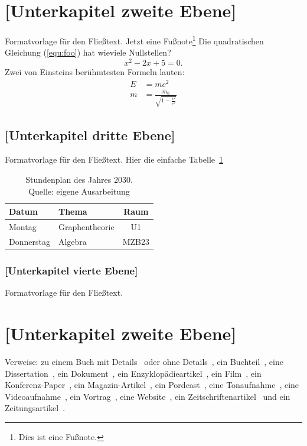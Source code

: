 \section{[Unterkapitel zweite Ebene]}
Formatvorlage für den Fließtext.
Jetzt eine Fußnote\footnote{Dies ist eine Fußnote.}
Die quadratischen Gleichung (\ref{equ:foo}) hat wieviele Nullstellen?
\begin{equation}
 \label{equ:foo}
 x^2-2x+5=0.
\end{equation}
Zwei von Einsteins berühmtesten Formeln lauten:
\begin{eqnarray*}
  E &= mc^2                                  \\
  m &= \frac{m_0}{\sqrt{1-\frac{v^2}{c^2}}}
\end{eqnarray*}


\subsection{[Unterkapitel dritte Ebene]}
Formatvorlage für den Fließtext. Hier die einfache Tabelle~\ref{tab:sp}

\begin{table}[htb]
  \centering
  \begin{tabular}{ | l | l |c|}
    \toprule
    Datum      & Thema           & Raum \\
    \midrule
    Montag     & Graphentheorie  & U1   \\
    \midrule
    Donnerstag & Algebra         & MZB23\\
    \bottomrule
  \end{tabular}
  \caption[Stundenplan]{Stundenplan des Jahres 2030.\\Quelle: eigene Ausarbeitung}\label{tab:sp}
\end{table}

\subsubsection{[Unterkapitel vierte Ebene]}
Formatvorlage für den Fließtext.



\section{[Unterkapitel zweite Ebene]}

Verweise: zu einem Buch mit Details~\cite[vgl.][Kapitel 2]{bathe_finite-elemente-methoden_1990} oder ohne Details~\cite{bathe_finite-elemente-methoden_1990}, ein Buchteil~\cite{areger_problem-based_2007}, eine Dissertation~\cite{sporn_interaktives_2000}, ein Dokument~\cite{industriellenvereinigung_beste_2014}, ein Enzyklopädieartikel~\cite{brockhaus_kreativitat_1872}, ein Film~\cite{de_wilde_through_2008}, ein Konferenz-Paper~\cite{weber_podcasts._2006}, ein Magazin-Artikel~\cite{autornachname1_magazinartikeltitel_1995}, ein Pordcast~\cite{paulus_horen_????}, eine Tonaufnahme~\cite{horowitz_horowitz_2003}, eine Videoaufnahme~\cite{fhvlearningsupport_was_2008}, ein Vortrag~\cite{kohls_literaturverwaltung_2008}, eine Website~\cite{wedekind_von_2008}, ein Zeitschriftenartikel~\cite{hofer_wir_2008} und ein Zeitungsartikel~\cite{schenkel_tsunami_2012}.


